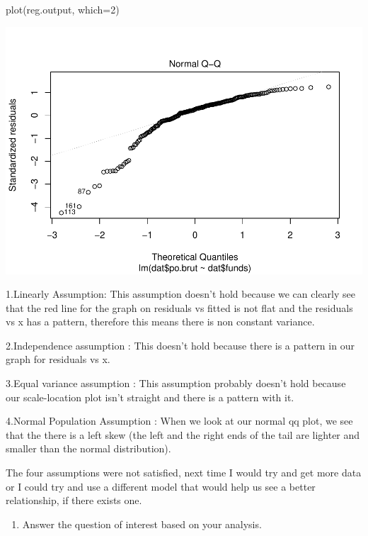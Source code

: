 \documentclass[
]{article}
\newenvironment{Shaded}{\begin{snugshade}}{\end{snugshade}}
\newcommand{\AttributeTok}[1]{\textcolor[rgb]{0.77,0.63,0.00}{#1}}
\newcommand{\DecValTok}[1]{\textcolor[rgb]{0.00,0.00,0.81}{#1}}
\newcommand{\FunctionTok}[1]{\textcolor[rgb]{0.00,0.00,0.00}{#1}}
\newcommand{\NormalTok}[1]{#1}
\providecommand{\tightlist}{%
  \setlength{\itemsep}{0pt}\setlength{\parskip}{0pt}}
\begin{document}
\begin{Shaded}
\begin{Highlighting}[]
\FunctionTok{plot}\NormalTok{(reg.output, }\AttributeTok{which=}\DecValTok{2}\NormalTok{)}
\end{Highlighting}
\end{Shaded}

\includegraphics{Journal_files/figure-latex/unnamed-chunk-34-6.pdf}

1.Linearly Assumption: This assumption doesn't hold because we can
clearly see that the red line for the graph on residuals vs fitted is
not flat and the residuals vs x has a pattern, therefore this means
there is non constant variance.

2.Independence assumption : This doesn't hold because there is a pattern
in our graph for residuals vs x.

3.Equal variance assumption : This assumption probably doesn't hold
because our scale-location plot isn't straight and there is a pattern
with it.

4.Normal Population Assumption : When we look at our normal qq plot, we
see that the there is a left skew (the left and the right ends of the
tail are lighter and smaller than the normal distribution).

The four assumptions were not satisfied, next time I would try and get
more data or I could try and use a different model that would help us
see a better relationship, if there exists one.

\begin{enumerate}
\def\labelenumi{\alph{enumi}.}
\setcounter{enumi}{4}
\tightlist
\item
  Answer the question of interest based on your analysis.
\end{enumerate}
\end{document}
